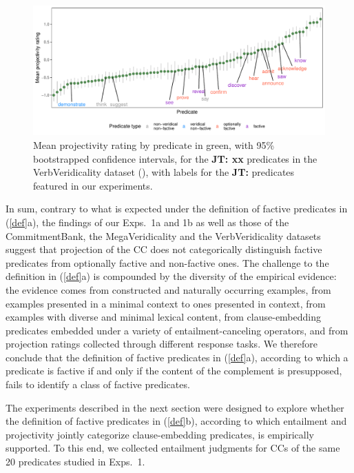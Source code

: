 \documentclass[11pt,fleqn]{article}
\newcommand{\6}{\mbox{$[\hspace*{-.6mm}[$}}
\newcommand{\9}{\mbox{$]\hspace*{-.6mm}]$}}
\newcommand{\jt}[1]{\textbf{\color{blue}JT: #1}}
\begin{document}
\begin{figure}[H]
\centering
\includegraphics[width=.77\paperwidth]{../../VerbVeridicality-analysis/graphs/means-projection-by-predicate}

\caption{Mean projectivity rating by predicate in green, with 95\% bootstrapped confidence intervals, for the \jt{xx} predicates in the VerbVeridicality dataset (\citealt{ross-pavlick2019}), with labels for the \jt{} predicates featured in our experiments.}
\label{f-vv-projectivity}
\end{figure}



In sum, contrary to what is expected under the definition of factive predicates in (\ref{def}a), the findings of our Exps.~1a and 1b as well as those of the CommitmentBank, the MegaVeridicality and the VerbVeridicality datasets suggest that projection of the CC does not categorically distinguish factive predicates from optionally factive and non-factive ones. The challenge to the definition in (\ref{def}a) is compounded by the diversity of the empirical evidence: the evidence comes from constructed and naturally occurring examples, from examples presented in a minimal context to ones presented in context, from examples with diverse and minimal lexical content, from clause-embedding predicates embedded under a variety of entailment-canceling operators, and from projection ratings collected through different response tasks. We therefore conclude that the definition of factive predicates in (\ref{def}a), according to which a predicate is factive if and only if the content of the complement is presupposed, fails to identify a class of factive predicates. 

The experiments described in the next section were designed to explore whether the definition of factive predicates in (\ref{def}b), according to which entailment and projectivity jointly categorize clause-embedding predicates, is empirically supported. To this end, we collected entailment judgments for CCs of the same 20 predicates studied in Exps.~1.
\end{document}
